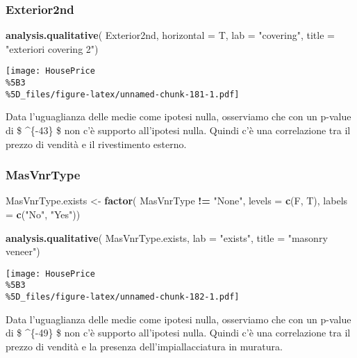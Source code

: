 \documentclass[
]{article}
\newenvironment{Shaded}{\begin{snugshade}}{\end{snugshade}}
\newcommand{\AttributeTok}[1]{\textcolor[rgb]{0.13,0.29,0.53}{#1}}
\newcommand{\FunctionTok}[1]{\textcolor[rgb]{0.13,0.29,0.53}{\textbf{#1}}}
\newcommand{\NormalTok}[1]{#1}
\newcommand{\OtherTok}[1]{\textcolor[rgb]{0.56,0.35,0.01}{#1}}
\newcommand{\SpecialCharTok}[1]{\textcolor[rgb]{0.81,0.36,0.00}{\textbf{#1}}}
\newcommand{\StringTok}[1]{\textcolor[rgb]{0.31,0.60,0.02}{#1}}
\begin{document}
\subsubsection{Exterior2nd}\label{exterior2nd-1}

\begin{Shaded}
\begin{Highlighting}[]
\FunctionTok{analysis.qualitative}\NormalTok{(}
\NormalTok{    Exterior2nd,}
    \AttributeTok{horizontal =}\NormalTok{ T,}
    \AttributeTok{lab =} \StringTok{"covering"}\NormalTok{,}
    \AttributeTok{title =} \StringTok{"exteriori covering 2"}\NormalTok{)}
\end{Highlighting}
\end{Shaded}

\texttt{[image: HousePrice\\\%5B3\\\%5D\_files/figure-latex/unnamed-chunk-181-1.pdf]}

Data l'uguaglianza delle medie come ipotesi nulla, osserviamo che con un
p-value di \$ \^{}\{-43\} \$ non c'è supporto all'ipotesi
nulla. Quindi c'è una correlazione tra il prezzo di vendità e il
rivestimento esterno.

\subsubsection{MasVnrType}\label{masvnrtype-1}

\begin{Shaded}
\begin{Highlighting}[]
\NormalTok{MasVnrType.exists }\OtherTok{\textless{}{-}} \FunctionTok{factor}\NormalTok{(}
\NormalTok{    MasVnrType }\SpecialCharTok{!=} \StringTok{"None"}\NormalTok{,}
    \AttributeTok{levels =} \FunctionTok{c}\NormalTok{(F, T), }
    \AttributeTok{labels =} \FunctionTok{c}\NormalTok{(}\StringTok{"No"}\NormalTok{, }\StringTok{"Yes"}\NormalTok{))}

\FunctionTok{analysis.qualitative}\NormalTok{(}
\NormalTok{    MasVnrType.exists,}
    \AttributeTok{lab =} \StringTok{"exists"}\NormalTok{,}
    \AttributeTok{title =} \StringTok{"masonry veneer"}\NormalTok{)}
\end{Highlighting}
\end{Shaded}

\texttt{[image: HousePrice\\\%5B3\\\%5D\_files/figure-latex/unnamed-chunk-182-1.pdf]}

Data l'uguaglianza delle medie come ipotesi nulla, osserviamo che con un
p-value di \$ \^{}\{-49\} \$ non c'è supporto all'ipotesi
nulla. Quindi c'è una correlazione tra il prezzo di vendità e la
presenza dell'impiallacciatura in muratura.
\end{document}
